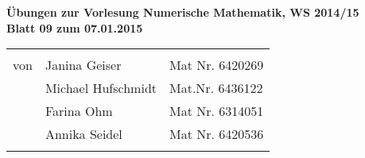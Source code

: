 \documentclass[11pt]{article}
\begin{document}
\begin{center}
\textbf{
Übungen zur Vorlesung Numerische Mathematik, WS 2014/15\\
Blatt 09 zum 07.01.2015\\
}

\begin{tabular}{lll}
& \\
von & Janina Geiser & Mat Nr. 6420269\\
& Michael Hufschmidt & Mat.Nr. 6436122\\
& Farina Ohm & Mat Nr. 6314051\\
& Annika Seidel & Mat Nr. 6420536\\
\\
\hline
\end{tabular}
\end{center}








\end{document}
